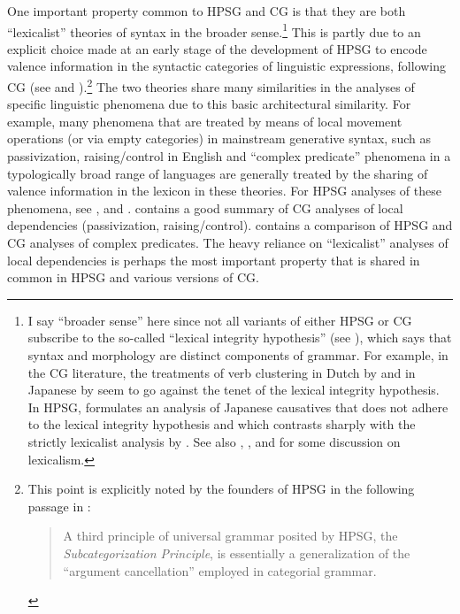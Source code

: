 \documentclass[output=paper
                ,modfonts
                ,nonflat
	        ,collection
	        ,collectionchapter
	        ,collectiontoclongg
 	        ,biblatex
                ,babelshorthands
                ,newtxmath
                ,draftmode
                ,colorlinks, citecolor=brown
]{./langsci/langscibook}
\begin{document}
One important property common to HPSG and CG is that they are both
``lexicalist'' theories of syntax in the broader sense.\footnote{I say
``broader sense'' here since not all variants of either HPSG or CG subscribe to the
so-called ``lexical integrity hypothesis'' (see 
), which says that syntax and 
morphology are distinct components of grammar. For example, in the CG literature, 
the treatments of verb clustering in Dutch by \citet{moortgatoehrle94} and
in Japanese by \citet{Kubota2014a-u} seem to go against the tenet of
the lexical integrity hypothesis. In HPSG,
\citet{Gunji99a-u} formulates an analysis of Japanese
causatives that does not adhere to the lexical integrity hypothesis and which 
contrasts sharply with the strictly lexicalist analysis by 
\citet{MSI99a}. 
See also , 
\citet{Bruening2018a, Bruening2018c-u}, \citet{MuellerLexicalism} and \citet{MWArgSt}
for some discussion on lexicalism.} 
This is partly due to an explicit choice made at an early
stage of the development of HPSG to encode valence information in the
syntactic categories of linguistic expressions, following CG
(see  and ).\footnote{This
  point is explicitly noted by the founders of HPSG
  in the following passage in \citet{ps}:

\begin{quote}
A third principle of universal grammar posited by HPSG, the
\textit{Subcategorization Principle}, is essentially a generalization of the
``argument cancellation'' employed in categorial grammar. \hfill \citep[11]{ps}
\end{quote}

}
The two theories share many similarities in the
analyses of specific linguistic phenomena due to this basic
architectural similarity. For example, many phenomena that are treated
by means of local movement operations (or via empty categories) in
mainstream generative syntax, such as passivization, raising/control in English
and ``complex predicate'' phenomena in a typologically broad range of
languages are generally treated by the sharing of valence information
in the lexicon in these theories. For HPSG
analyses of these phenomena, see
,  
and .
\citet{steedman2011ccg} contains a good
summary of CG analyses of local dependencies 
(passivization, raising/control). \citet{Kubota2014a-u} contains
a comparison of HPSG and CG analyses of complex predicates.
The heavy reliance on ``lexicalist'' analyses of
local dependencies 
is perhaps the most important property that is shared in common in
HPSG and various versions of CG.
\end{document}
